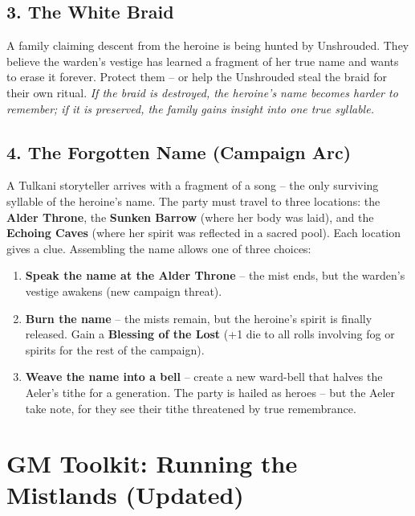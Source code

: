 \documentclass[12pt]{article}
\begin{document}
\subsection{3. The White Braid}
A family claiming descent from the heroine is being hunted by Unshrouded. They believe the warden's vestige has learned a fragment of her true name and wants to erase it forever. Protect them -- or help the Unshrouded steal the braid for their own ritual. \textit{If the braid is destroyed, the heroine's name becomes harder to remember; if it is preserved, the family gains insight into one true syllable.}

\subsection{4. The Forgotten Name (Campaign Arc)}
A Tulkani storyteller arrives with a fragment of a song -- the only surviving syllable of the heroine's name. The party must travel to three locations: the \textbf{Alder Throne}, the \textbf{Sunken Barrow} (where her body was laid), and the \textbf{Echoing Caves} (where her spirit was reflected in a sacred pool). Each location gives a clue. Assembling the name allows one of three choices:
\begin{enumerate}[label=\arabic*.]
  \item \textbf{Speak the name at the Alder Throne} -- the mist ends, but the warden's vestige awakens (new campaign threat).
  \item \textbf{Burn the name} -- the mists remain, but the heroine's spirit is finally released. Gain a \textbf{Blessing of the Lost} (+1 die to all rolls involving fog or spirits for the rest of the campaign).
  \item \textbf{Weave the name into a bell} -- create a new ward-bell that halves the Aeler's tithe for a generation. The party is hailed as heroes -- but the Aeler take note, for they see their tithe threatened by true remembrance.
\end{enumerate}

\section{GM Toolkit: Running the Mistlands (Updated)}
\end{document}
